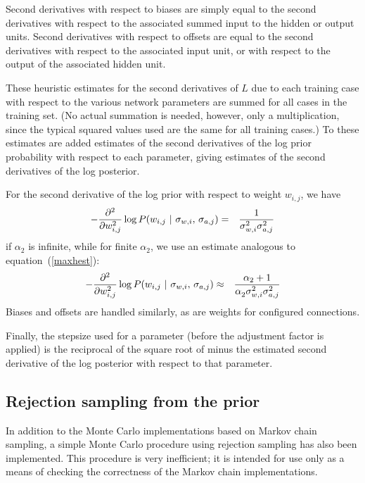\documentclass{report}[11pt]
\def\beq{\begin{eqnarray}}
\def\eeq{\end{eqnarray}}
\begin{document}
Second derivatives with respect to biases are simply equal to the
second derivatives with respect to the associated summed input to the
hidden or output units.  Second derivatives with respect to offsets
are equal to the second derivatives with respect to the associated
input unit, or with respect to the output of the associated hidden
unit.

These heuristic estimates for the second derivatives of $L$ due to
each training case with respect to the various network parameters are
summed for all cases in the training set.  (No actual summation is
needed, however, only a multiplication, since the typical squared
values used are the same for all training cases.)  To these estimates
are added estimates of the second derivatives of the log prior
probability with respect to each parameter, giving estimates of the
second derivatives of the log posterior.

For the second derivative of the log prior with respect to weight
$w_{i,j}$, we have\beq
  - {\partial^2 \over \partial w_{i,j}^2} 
      \log P(w_{i,j}\ |\ \sigma_{w,i},\,\sigma_{a,j}) 
    & = & {1 \over \sigma_{w,i}^2\sigma_{a,j}^2}
\eeq%
if $\alpha_2$ is infinite, while for finite $\alpha_2$, we use an
estimate analogous to equation~(\ref{maxhest}):\beq
 - {\partial^2 \over \partial w_{i,j}^2} 
      \log P(w_{i,j}\ |\ \sigma_{w,i},\,\sigma_{a,j}) 
   & \approx & {\alpha_2 + 1 \over \alpha_2^{\ } \sigma_{w,i}^2 \sigma_{a,j}^2} 
\eeq%
Biases and offsets are handled similarly, as are weights for 
configured connections.

Finally, the stepsize used for a parameter (before the adjustment
factor is applied) is the reciprocal of the square root of minus the
estimated second derivative of the log posterior with respect to that
parameter.


\subsection*{Rejection sampling from the prior}\label{app-rej}

In addition to the Monte Carlo implementations based on Markov chain
sampling, a simple Monte Carlo procedure using rejection sampling has
also been implemented.  This procedure is very inefficient; it is
intended for use only as a means of checking the correctness of the
Markov chain implementations.
\end{document}
